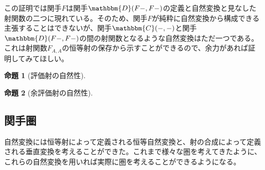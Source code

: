 \documentclass[uplatex,dvipdfmx]{jsarticle}
\newcommand{\cat}[1]{\mathbbm{#1}}
\newcommand{\arset}[3]{\cat{#1}(#2,#3)}
\newtheorem{prop}{命題}[section]
\numberwithin{proof}{subsection}
\numberwithin{prop}{subsection}
\numberwithin{define}{subsection}
\begin{document}
	この証明では関手$F$は関手$\arset{D}{F-}{F-}$の定義と自然変換と見なした射関数の二つに現れている。そのため、関手$F$が純粋に自然変換から構成できる主張することはできないが、関手$\arset{C}{-}{-}$と関手$\arset{D}{F-}{F-}$の間の射関数となるような自然変換はただ一つである。これは射関数$F_{A,A}$の恒等射の保存から示すことができるので、余力があれば証明してみてほしい。

  \begin{prop}[評価射の自然性]
    
  \end{prop}
  \begin{prop}[余評価射の自然性]
    
  \end{prop}
	\subsection{関手圏}
	自然変換には恒等射によって定義される恒等自然変換と、射の合成によって定義される垂直変換を考えることができた。これまで様々な圏を考えてきたように、これらの自然変換を用いれば実際に圏を考えることができるようになる。
\end{document}
